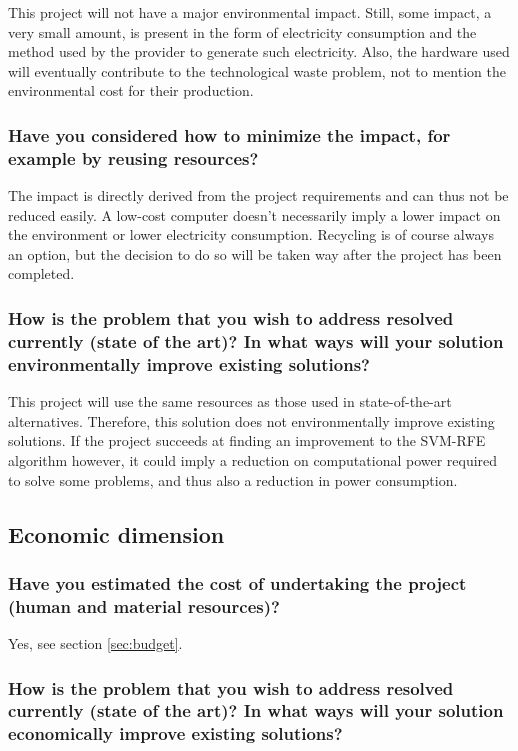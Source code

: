 This project will not have a major environmental impact. Still, some impact, a very small amount, is present in the form of electricity consumption and the method used by the provider to generate such electricity. Also, the hardware used will eventually contribute to the technological waste problem, not to mention the environmental cost for their production.

\subsubsection*{Have you considered how to minimize the impact, for example by reusing re\-sources?}

The impact is directly derived from the project requirements and can thus not be reduced easily. A low-cost computer doesn't necessarily imply a lower impact on the environment or lower electricity consumption. Recycling is of course always an option, but the decision to do so will be taken way after the project has been completed.

\subsubsection*{How is the problem that you wish to address resolved currently (state of the art)? In what ways will your solution environmentally improve exist\-ing solutions?}

This project will use the same resources as those used in state-of-the-art alternatives. Therefore, this solution does not environmentally improve existing solutions. If the project succeeds at finding an improvement to the SVM-RFE algorithm however, it could imply a reduction on computational power required to solve some problems, and thus also a reduction in power consumption.

\subsection{Economic dimension}

\subsubsection*{Have you estimated the cost of undertaking the project (human and material re\-sources)?}

Yes, see section \ref{sec:budget}.

\subsubsection*{How is the problem that you wish to address resolved currently (state of the art)? In what ways will your solution economically improve existing solutions?}


